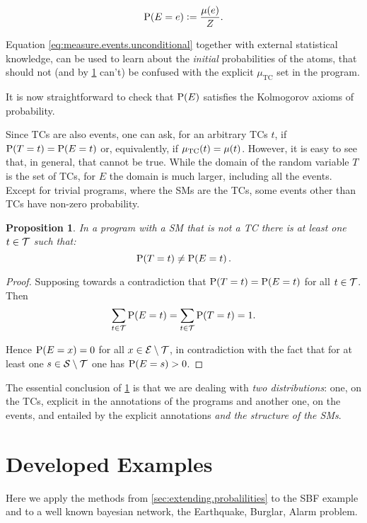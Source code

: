 \documentclass[a4paper, 10pt]{article}
\newtheorem{proposition}{Proposition}
\newcommand{\at}[1]{\ensuremath{\!\del{#1}}}
\newcommand{\fml}[1]{\ensuremath{{\cal #1}}}
\newcommand{\pr}[1]{\ensuremath{\mathrm{P}\at{#1}}}
\newcommand{\pw}[1]{\ensuremath{\mu\at{#1}}}
\newcommand{\pwcfname}{\ensuremath{\mu_{\textrm{TC}}}}
\newcommand{\pwc}[1]{\ensuremath{\pwcfname\at{#1}}}
\begin{document}
\begin{equation}
    \pr{E = e} := \frac{\pw{e}}{Z}.\label{eq:probability.event}
\end{equation}

Equation \eqref{eq:measure.events.unconditional} together with external statistical knowledge, can be used to learn about the \emph{initial} probabilities of the atoms, that should not (and by \cref{prop:two.distributions} can't) be confused with the explicit $\pwcfname$ set in the program.

It is now straightforward to check that $\pr{E}$ satisfies the Kolmogorov axioms of probability.

Since \aclp{TC} are also events, one can ask, for an arbitrary \aclp{TC}  $t$, if $\pr{T = t} = \pr{E = t}$ or, equivalently, if $\pwc{t} = \pw{t}$.  However, it is easy to see that, in general, that cannot be true. While the domain of the random variable $T$ is the set of \aclp{TC}, for $E$ the domain is much larger, including all the events. Except for trivial programs, where the \acp{SM} are the \acp{TC}, some events other than \aclp{TC} have non-zero probability.

\begin{proposition} \label{prop:two.distributions}
    In a program with a \acl{SM} that is not a \acl{TC} there is at least one $t\in\fml{T}$ such that:
    \begin{equation}
        \pr{T = t} \not= \pr{E = t}. \label{eq:two.distributions}
    \end{equation}
\end{proposition}

\begin{proof}
    Supposing towards a contradiction that $\pr{T = t} = \pr{E = t}$ for all $t \in \fml{T}$.  Then
    $$
        \sum_{t\in\fml{T}} \pr{E = t} = \sum_{t\in\fml{T}} \pr{T = t} = 1.
    $$

    Hence $\pr{E = x} = 0$ for all $x \in \fml{E}\setminus\fml{T}$, in contradiction with the fact that for at least one $s \in \fml{S}\setminus\fml{T}$ one has $\pr{E = s} > 0$.
\end{proof}

The essential conclusion of \cref{prop:two.distributions} is that we are dealing with \emph{two distributions}: one, on the \acp{TC}, explicit in the annotations of the programs and another one, on the events, and entailed by the explicit annotations \emph{and the structure of the \aclp{SM}}.

%
%
%
\section{Developed Examples}\label{sec:developed.examples}
%
%
%
Here we apply the methods from \cref{sec:extending.probalilities} to the SBF example and to a well known bayesian network, the Earthquake, Burglar, Alarm problem.
\end{document}
